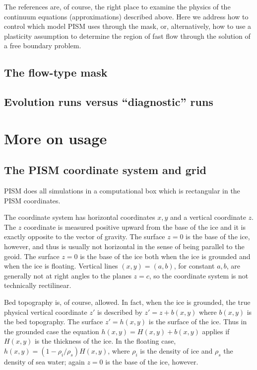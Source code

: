 \documentclass[11pt,final]{amsart}
\begin{document}
The references are, of course, the right place to examine the physics of the continuum equations (approximations) described above.  Here we address how to control which model PISM uses through the mask, or, alternatively, how to use a plasticity assumption to determine the region of fast flow through the solution of a free boundary problem.

\subsection{The flow-type mask} \label{subsect:mask}

\subsection{Evolution runs versus ``diagnostic'' runs}


\clearpage
\newpage
\section{More on usage}\label{sect:usage}

\subsection{The PISM coordinate system and grid} \label{subsect:coords} PISM does all simulations in a computational box which is rectangular in the PISM coordinates.

The coordinate system has horizontal coordinates $x,y$ and a vertical coordinate $z$.  The $z$ coordinate is measured positive upward from the base of the ice and it is exactly opposite to the vector of gravity.  The surface $z=0$ is the base of the ice, however, and thus is usually not horizontal in the sense of being parallel to the geoid.   The surface $z=0$ is the base of the ice both when the ice is grounded and when the ice is floating.  Vertical lines $(x,y)=(a,b)$, for constant $a,b$, are generally not at right angles to the planes $z=c$, so the coordinate system is not technically rectilinear.

Bed topography is, of course, allowed.  In fact, when the ice is grounded, the true physical vertical coordinate $z'$ is described by $z'=z+b(x,y)$ where $b(x,y)$ is the bed topography.  The surface $z'=h(x,y)$ is the surface of the ice.  Thus in the grounded case the equation $h(x,y)=H(x,y)+b(x,y)$ applies if $H(x,y)$ is the thickness of the ice.  In the floating case, $h(x,y) = (1-\rho_i/\rho_s) H(x,y)$, where $\rho_i$ is the density of ice and $\rho_s$ the density of sea water; again $z=0$ is the base of the ice, however.
\end{document}
